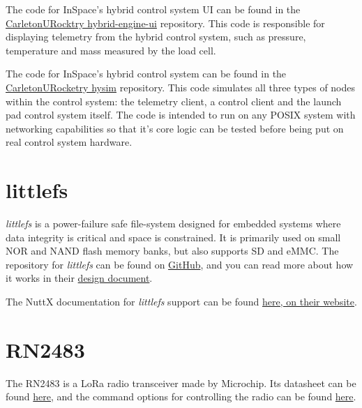 The code for InSpace's hybrid control system UI can be found in the
\href{https://github.com/CarletonURocketry/hybrid-engine-ui}{CarletonURocktry hybrid-engine-ui} repository. This code
is responsible for displaying telemetry from the hybrid control system, such as pressure, temperature and mass measured
by the load cell.

The code for InSpace's hybrid control system can be found in the
\href{https://github.com/CarletonURocketry/hysim}{CarletonURocketry hysim} repository. This code simulates all three
types of nodes within the control system: the telemetry client, a control client and the launch pad control system
itself. The code is intended to run on any POSIX system with networking capabilities so that it's core logic can be
tested before being put on real control system hardware.

\section{littlefs} \label{apx:littlefs}

\textit{littlefs} is a power-failure safe file-system designed for embedded systems where data integrity is critical and
space is constrained. It is primarily used on small NOR and NAND flash memory banks, but also supports SD and eMMC. The
repository for \textit{littlefs} can be found on \href{https://github.com/littlefs-project/littlefs}{GitHub}, and you can read more about how it works in their
\href{https://github.com/littlefs-project/littlefs/blob/master/DESIGN.md}{design document}.

The NuttX documentation for \textit{littlefs} support can be found
\href{https://nuttx.apache.org/docs/latest/components/filesystem/littlefs.html}{here, on their website}.

\section{RN2483} \label{apx:rn483}

The RN2483 is a LoRa radio transceiver made by Microchip. Its datasheet can be found
\href{https://ww1.microchip.com/downloads/aemDocuments/documents/OTH/ProductDocuments/DataSheets/RN2483-Low-Power-Long-Range-LoRa-Technology-Transceiver-Module-DS50002346F.pdf}{here},
and the command options for controlling the radio can be found
\href{https://ww1.microchip.com/downloads/en/DeviceDoc/RN2483-LoRa-Technology-Module-Command-Reference-User-Guide-DS40001784G.pdf}{here}.
